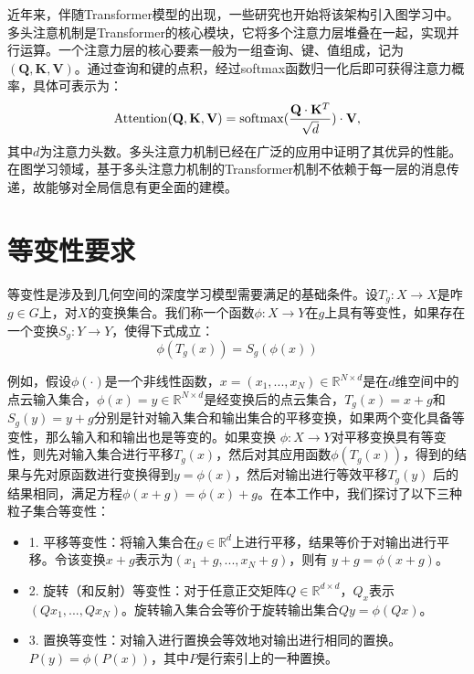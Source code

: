 近年来，伴随Transformer模型的出现，一些研究也开始将该架构引入图学习中。多头注意机制是Transformer的核心模块，它将多个注意力层堆叠在一起，实现并行运算。一个注意力层的核心要素一般为一组查询、键、值组成，记为$(\mathbf{Q}, \mathbf{K}, \mathbf{V})$。通过查询和键的点积，经过softmax函数归一化后即可获得注意力概率，具体可表示为：
\begin{eqnarray}
    {\rm Attention}(\mathbf{Q}, \mathbf{K}, \mathbf{V}) = {\rm softmax}(\frac{\mathbf{Q} \cdot \mathbf{K}^T}{\sqrt{d}}) \cdot \mathbf{V},
\end{eqnarray}
其中$d$为注意力头数。多头注意力机制已经在广泛的应用中证明了其优异的性能。在图学习领域，基于多头注意力机制的Transformer机制不依赖于每一层的消息传递，故能够对全局信息有更全面的建模。

\section{等变性要求}
等变性是涉及到几何空间的深度学习模型需要满足的基础条件。设$T_g: X \to X$是咋$g \in G$上，对$X$的变换集合。我们称一个函数$\phi: X \to Y$在$g$上具有等变性，如果存在一个变换$S_g: Y \to Y$，使得下式成立：
\begin{equation}
    \phi (T_g(x)) = S_g(\phi (x))
\end{equation}

例如，假设$\phi (\cdot)$是一个非线性函数，$x = (x_1, ..., x_N) \in \mathbb{R}^{N \times d}$是在$d$维空间中的点云输入集合，$\phi (x) = y \in \mathbb{R}^{N \times d}$是经变换后的点云集合，$T_g (x) = x + g$和$S_g(y) = y + g$分别是针对输入集合和输出集合的平移变换，如果两个变化具备等变性，那么输入和和输出也是等变的。如果变换 $\phi : X \to Y$对平移变换具有等变性，则先对输入集合进行平移$T_g(x)$，然后对其应用函数$\phi(T_g(x))$，得到的结果与先对原函数进行变换得到$y = \phi(x)$，然后对输出进行等效平移$T_g(y)$ 后的结果相同，满足方程$\phi (x+g) = \phi (x) + g$。在本工作中，我们探讨了以下三种粒子集合等变性：
\begin{itemize}
    \item 1. 平移等变性：将输入集合在$g \in \mathbb{R}^d$上进行平移，结果等价于对输出进行平移。令该变换$x + g$表示为$(x_1+g, ..., x_N + g)$，则有 $y+g = \phi (x+g)$。
    \item 2. 旋转（和反射）等变性：对于任意正交矩阵$Q \in \mathbb{R}^{d \times d}$，$Q_x$表示$(Qx_1, ..., Qx_N)$。旋转输入集合会等价于旋转输出集合$Qy = \phi(Qx)$。
    \item 3. 置换等变性：对输入进行置换会等效地对输出进行相同的置换。$P(y) = \phi(P(x))$，其中$P$是行索引上的一种置换。
\end{itemize}


